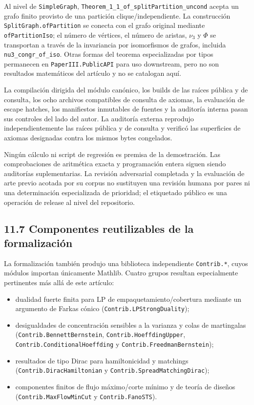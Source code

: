 \documentclass[spanish,11pt,a4paper]{article}
\providecommand{\tightlist}{\setlength{\itemsep}{0pt}\setlength{\parskip}{0pt}}
\begin{document}
Al nivel de \nolinkurl{SimpleGraph},
\nolinkurl{Theorem_1_1_of_splitPartition_uncond} acepta un grafo
finito provisto de una partición clique/independiente. La construcción
\nolinkurl{SplitGraph.ofPartition} se conecta con el grafo original
mediante \nolinkurl{ofPartitionIso}; el número de vértices, el número de
aristas, \(\nu_3\) y \(\Phi\) se transportan a través de la invariancia
por isomorfismos de grafos, incluida \nolinkurl{nu3_congr_of_iso}. Otras
formas del teorema especializadas por tipos permanecen en
\nolinkurl{PaperIII.PublicAPI} para uso downstream, pero no son resultados
matemáticos del artículo y no se catalogan aquí.

La compilación dirigida del módulo canónico, los builds de las raíces
pública y de consulta, los ocho archivos compatibles de consulta de
axiomas, la evaluación de escape hatches, los manifiestos inmutables de
fuentes y la auditoría interna pasan sus controles del lado del autor.
La auditoría externa reprodujo independientemente las raíces pública y
de consulta y verificó las superficies de axiomas designadas contra los
mismos bytes congelados.

Ningún cálculo ni script de regresión es premisa de la demostración. Las
comprobaciones de aritmética exacta y programación entera siguen siendo
auditorías suplementarias. La revisión adversarial completada y la
evaluación de arte previo acotada por su corpus no sustituyen una
revisión humana por pares ni una determinación especializada de
prioridad; el etiquetado público es una operación de release al nivel
del repositorio.

\subsection{11.7 Componentes reutilizables de la
formalización}\label{componentes-reutilizables-de-la-formalizaciuxf3n}

La formalización también produjo una biblioteca independiente
\nolinkurl{Contrib.*}, cuyos módulos importan únicamente Mathlib. Cuatro
grupos resultan especialmente pertinentes más allá de este artículo:

\begin{itemize}
\tightlist
\item
  dualidad fuerte finita para LP de empaquetamiento/cobertura mediante
  un argumento de Farkas cónico (\nolinkurl{Contrib.LPStrongDuality});
\item
  desigualdades de concentración sensibles a la varianza y colas de
  martingalas (\nolinkurl{Contrib.BennettBernstein},
  \nolinkurl{Contrib.HoeffdingUpper}, \nolinkurl{Contrib.ConditionalHoeffding}
  y \nolinkurl{Contrib.FreedmanBernstein});
\item
  resultados de tipo Dirac para hamiltonicidad y matchings
  (\nolinkurl{Contrib.DiracHamiltonian} y
  \nolinkurl{Contrib.SpreadMatchingDirac});
\item
  componentes finitos de flujo máximo/corte mínimo y de teoría de
  diseños (\nolinkurl{Contrib.MaxFlowMinCut} y \nolinkurl{Contrib.FanoSTS}).
\end{itemize}
\end{document}
